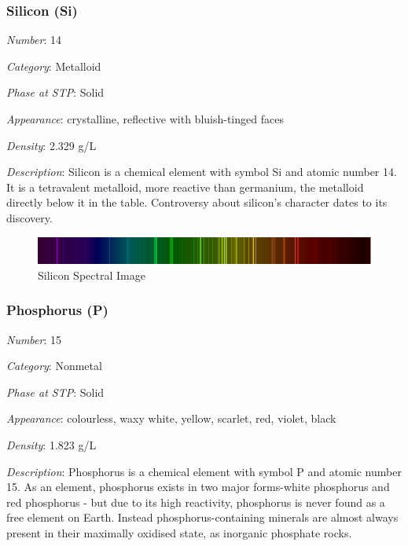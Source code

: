 \documentclass{article}
\begin{document}
\hypertarget{subsubsection::Si}{}\subsubsection{Silicon (Si)}

\textit{Number}: 14

\textit{Category}: Metalloid

\textit{Phase at STP}: Solid

\textit{Appearance}: crystalline, reflective with bluish-tinged faces

\textit{Density}: 2.329 g/L

\textit{Description}: Silicon is a chemical element with symbol Si and atomic number 14. It is a tetravalent metalloid, more reactive than germanium, the metalloid directly below it in the table. Controversy about silicon's character dates to its discovery.

\immediate{}
\begin{figure}[!ht]
    \centering
    \includegraphics[width=12cm]{./resources/spectral_img/Silicon_Spectra.jpg}
    \caption{Silicon Spectral Image}
\end{figure}

\hypertarget{subsubsection::P}{}\subsubsection{Phosphorus (P)}

\textit{Number}: 15

\textit{Category}: Nonmetal

\textit{Phase at STP}: Solid

\textit{Appearance}: colourless, waxy white, yellow, scarlet, red, violet, black

\textit{Density}: 1.823 g/L

\textit{Description}: Phosphorus is a chemical element with symbol P and atomic number 15. As an element, phosphorus exists in two major forms-white phosphorus and red phosphorus - but due to its high reactivity, phosphorus is never found as a free element on Earth. Instead phosphorus-containing minerals are almost always present in their maximally oxidised state, as inorganic phosphate rocks.
\end{document}
